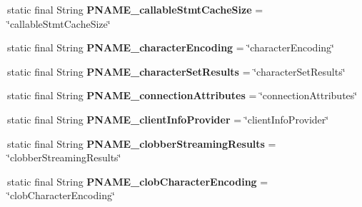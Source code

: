 \begin{DoxyCompactItemize}
static final String {\bfseries P\+N\+A\+M\+E\+\_\+callable\+Stmt\+Cache\+Size} = \char`\"{}callable\+Stmt\+Cache\+Size\char`\"{}
\item 
\mbox{\label{classcom_1_1mysql_1_1cj_1_1conf_1_1_property_definitions_a489a6767f196f3cae0dda8e14441ed0a}} 
static final String {\bfseries P\+N\+A\+M\+E\+\_\+character\+Encoding} = \char`\"{}character\+Encoding\char`\"{}
\item 
\mbox{\label{classcom_1_1mysql_1_1cj_1_1conf_1_1_property_definitions_a856ce718c25412a9648602fa8da496b0}} 
static final String {\bfseries P\+N\+A\+M\+E\+\_\+character\+Set\+Results} = \char`\"{}character\+Set\+Results\char`\"{}
\item 
\mbox{\label{classcom_1_1mysql_1_1cj_1_1conf_1_1_property_definitions_a9b613c0735a19f3d79caf54acf83816e}} 
static final String {\bfseries P\+N\+A\+M\+E\+\_\+connection\+Attributes} = \char`\"{}connection\+Attributes\char`\"{}
\item 
\mbox{\label{classcom_1_1mysql_1_1cj_1_1conf_1_1_property_definitions_af9b37c508150b652d90f0f0c26068353}} 
static final String {\bfseries P\+N\+A\+M\+E\+\_\+client\+Info\+Provider} = \char`\"{}client\+Info\+Provider\char`\"{}
\item 
\mbox{\label{classcom_1_1mysql_1_1cj_1_1conf_1_1_property_definitions_a6dfc017c3935c02a095f1148ff210b1a}} 
static final String {\bfseries P\+N\+A\+M\+E\+\_\+clobber\+Streaming\+Results} = \char`\"{}clobber\+Streaming\+Results\char`\"{}
\item 
\mbox{\label{classcom_1_1mysql_1_1cj_1_1conf_1_1_property_definitions_ac7cf808189c5fd9eeb73532c341b856a}} 
static final String {\bfseries P\+N\+A\+M\+E\+\_\+clob\+Character\+Encoding} = \char`\"{}clob\+Character\+Encoding\char`\"{}
\item 
\mbox{\label{classcom_1_1mysql_1_1cj_1_1conf_1_1_property_definitions_ad5cfe0b2e74bee2ebfe18b4bfba9f76a}} 

\end{DoxyCompactItemize}
